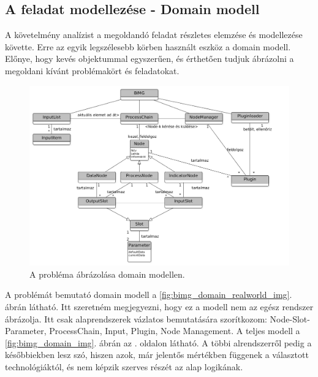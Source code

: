 \documentclass[a4paper,12pt,oneside]{report}
\begin{document}
\subsection{A feladat modellezése - Domain modell}
A követelmény analízist a megoldandó feladat részletes elemzése és modellezése követte. Erre az egyik legszélesebb körben használt eszköz a domain modell. Előnye, hogy kevés objektummal egyszerűen, és érthetően tudjuk ábrázolni a megoldani kívánt problémakört és feladatokat.\cite{book:usecase_book_brief}
\begin{center}
\begin{figure}[h]
  \includegraphics[width=1.1\textwidth]{domain_real_gray.png}
  \caption{A probléma ábrázolása domain modellen. }

  \label{fig:bimg_domain_minimal_img}
\end{figure}
\end{center}
A problémát bemutató domain modell a \ref{fig:bimg_domain_realworld_img}. ábrán látható. Itt szeretném megjegyezni, hogy ez a modell nem az egész rendszer ábrázolja. Itt csak alaprendszerek vázlatos bemutatására szorítkozom: Node-Slot-Parameter, ProcessChain, Input, Plugin, Node Management. A teljes modell a \ref{fig:bimg_domain_img}. ábrán az \pageref{fig:bimg_domain_img}. oldalon látható. A többi alrendszerről pedig a későbbiekben lesz szó, hiszen azok, már jelentős mértékben függenek a választott technológiáktól, és nem képzik szerves részét az alap logikának.
\end{document}
